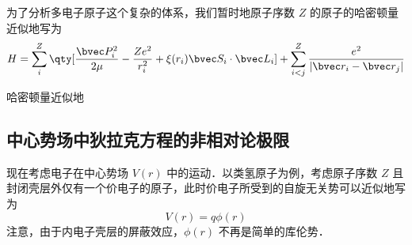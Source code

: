 
为了分析多电子原子这个复杂的体系，我们暂时地原子序数 $Z$ 的原子的哈密顿量近似地写为
\begin{equation}
H=\sum_{i}^{Z} \qty[\frac{\bvec P_i^2}{2\mu} - \frac{Z e^2}{r_i^2}+\xi(r_i)\bvec S_i\cdot \bvec L_i]+\sum_{i<j}^Z \frac{e^2}{|\bvec r_i-\bvec r_j|}
\end{equation}

哈密顿量近似地
\subsection{中心势场中狄拉克方程的非相对论极限}
现在考虑电子在中心势场 $V(r)$ 中的运动．以类氢原子为例，考虑原子序数 $Z$ 且封闭壳层外仅有一个价电子的原子，此时价电子所受到的自旋无关势可以近似地写为
\begin{equation}
V(r)=q\phi(r)
\end{equation}
注意，由于内电子壳层的屏蔽效应，$\phi(r)$ 不再是简单的库伦势．